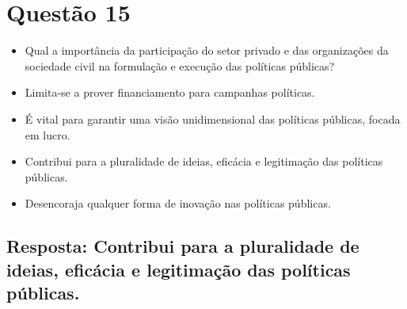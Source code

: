 \documentclass[
   article,       
   12pt,          
   oneside,       
   a4paper,       
   english,       
   brazil,        
   sumario=tradicional
   ]{abntex2}
\begin{document}
\section{Questão 15}
\begin{itemize}
    \item Qual a importância da participação do setor privado e das organizações da sociedade civil na formulação e execução das políticas públicas?
    \item Limita-se a prover financiamento para campanhas políticas.
    \item É vital para garantir uma visão unidimensional das políticas públicas, focada em lucro.
    \item Contribui para a pluralidade de ideias, eficácia e legitimação das políticas públicas.
    \item Desencoraja qualquer forma de inovação nas políticas públicas.
\end{itemize}
\subsection{Resposta: Contribui para a pluralidade de ideias, eficácia e legitimação das políticas públicas.}
\postextual

\end{document}

